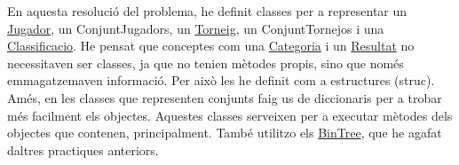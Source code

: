 En aquesta resolució del problema, he definit classes per a representar un \mbox{\hyperlink{class_jugador}{Jugador}}, un Conjunt\+Jugadors, un \mbox{\hyperlink{class_torneig}{Torneig}}, un Conjunt\+Tornejos i una \mbox{\hyperlink{class_classificacio}{Classificacio}}. He pensat que conceptes com una \mbox{\hyperlink{struct_categoria}{Categoria}} i un \mbox{\hyperlink{struct_resultat}{Resultat}} no necessitaven ser classes, ja que no tenien mètodes propis, sino que només emmagatzemaven informació. Per això les he definit com a estructures (struc). A\textquotesingle{}més, en les classes que representen conjunts faig us de diccionaris per a trobar més facilment els objectes. Aquestes classes serveixen per a executar mètodes dels objectes que contenen, principalment. També utilitzo els \mbox{\hyperlink{class_bin_tree}{Bin\+Tree}}, que he agafat d\textquotesingle{}altres practiques anteriors. 